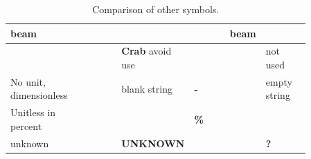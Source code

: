 \documentclass[11pt,notitlepage,onecolumn]{ivoa}
\newcommand{\unit}[1]{\textbf{\textsf{\color{orange}#1}}}
\begin{document}
\begin{table}[ht]
\begin{tabular}{|p{0.2\linewidth}|p{0.15\linewidth}|p{0.12\linewidth}|p{0.12\linewidth}|p{0.12\linewidth}|p{0.15\linewidth}|}
    beam & \unit{} & \unit{} & \unit{} & \unit{beam} &\\\hline
     & \unit{} & \unit{Crab} avoid use & \unit{} & \unit{} & not used \\\hline
    No unit, dimensionless & \unit{} & blank string & \unit{-} & \unit{} & empty string \\\hline
    Unitless in percent & \unit{} &  & \unit{\%} & \unit{} & \unit{} \\\hline
    unknown & \unit{} & {\tiny\unit{UNKNOWN}} & \unit{} & \unit{} & \unit{?} \\\hline
\end{tabular}
  \caption{Comparison of other symbols.}
  \label{tabx:comparUnitOther}
\end{table}

\clearpage

\end{document}
